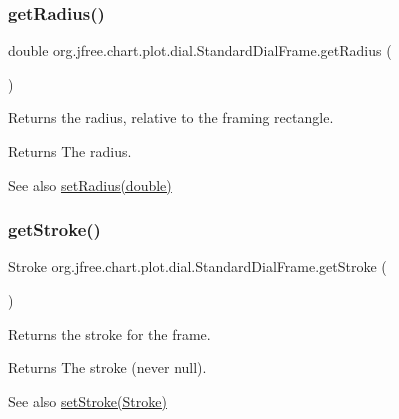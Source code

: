\subsubsection{\texorpdfstring{get\+Radius()}{getRadius()}}
{\footnotesize\ttfamily double org.\+jfree.\+chart.\+plot.\+dial.\+Standard\+Dial\+Frame.\+get\+Radius (\begin{DoxyParamCaption}{ }\end{DoxyParamCaption})}

Returns the radius, relative to the framing rectangle.

\begin{DoxyReturn}{Returns}
The radius.
\end{DoxyReturn}
\begin{DoxySeeAlso}{See also}
\mbox{\hyperlink{classorg_1_1jfree_1_1chart_1_1plot_1_1dial_1_1_standard_dial_frame_a775d5be898cb10aed3d5b8489673b0f4}{set\+Radius(double)}} 
\end{DoxySeeAlso}
\mbox{\label{classorg_1_1jfree_1_1chart_1_1plot_1_1dial_1_1_standard_dial_frame_acbf9547e14794fe78b448966cabe6051}} 
\subsubsection{\texorpdfstring{get\+Stroke()}{getStroke()}}
{\footnotesize\ttfamily Stroke org.\+jfree.\+chart.\+plot.\+dial.\+Standard\+Dial\+Frame.\+get\+Stroke (\begin{DoxyParamCaption}{ }\end{DoxyParamCaption})}

Returns the stroke for the frame.

\begin{DoxyReturn}{Returns}
The stroke (never {\ttfamily null}).
\end{DoxyReturn}
\begin{DoxySeeAlso}{See also}
\mbox{\hyperlink{classorg_1_1jfree_1_1chart_1_1plot_1_1dial_1_1_standard_dial_frame_a8636b33867fa14b44589e7f20fc33ec1}{set\+Stroke(\+Stroke)}} 
\end{DoxySeeAlso}
\mbox{\label{classorg_1_1jfree_1_1chart_1_1plot_1_1dial_1_1_standard_dial_frame_aa32ae5b534b6461b43ae970382ac18ea}} 
